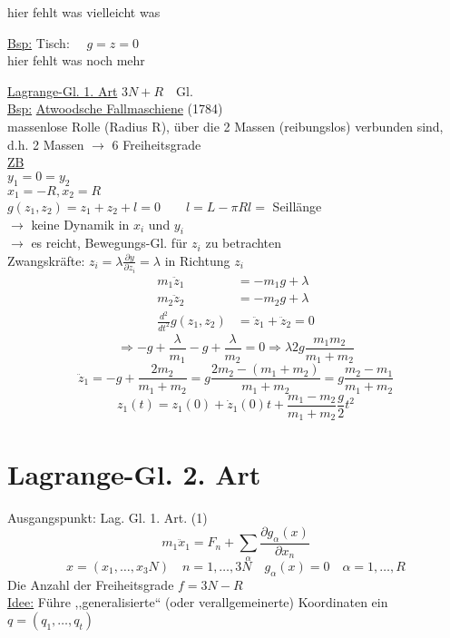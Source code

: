 \documentclass[titlepage,12pt,a4paper,ngerman]{report}
\newcommand{\tx}[1]{\textrm{#1}}
\begin{document}
{hier fehlt was vielleicht was

\underline{Bsp:} Tisch: $  \quad g = z = 0 $\\

hier fehlt was noch mehr


\underline{Lagrange-Gl. 1. Art}
$ 3N+R \quad \tx{Gl.} $\\
\underline{Bsp:} \underline{Atwoodsche Fallmaschiene} (1784)\\
massenlose Rolle (Radius R), über die 2 Massen (reibungslos) verbunden sind, d.h. 2 Massen $ \rightarrow $ 6 Freiheitsgrade\\
\underline{ZB} \\
$ y_1 = 0 = y_2 $\\
$ x_1 = - R , x_2 = R $\\
$  g(z_1,z_2) = z_1 + z_2 + l = 0 \qquad l = L- \pi R  l = $ Seillänge\\
$ \rightarrow $ keine Dynamik in $ x_i $ und $ y_i $\\
$ \rightarrow $ es reicht, Bewegungs-Gl. für $ z_i $ zu betrachten\\
Zwangskräfte: $  z_i = \lambda \frac{\partial y}{\partial z_i}  = \lambda $ in Richtung $ z_i $\\
\begin{align*}
m_1 \ddot{z}_1 &= - m_1 g + \lambda \\
m_2 \ddot{z}_2 &= - m_2 g + \lambda \\
\frac{d^2}{dt^2} g(z_1,z_2) &= \ddot{z}_1 + \ddot{z}_2 = 0
\end{align*}
$$ \Rightarrow -g +\frac{\lambda}{m_1} - g + \frac{\lambda}{m_2} = 0 \Rightarrow \lambda 2 g \frac{m_1 m_2 }{m_1 + m_2}$$
$$ \ddot{z}_1 = -g + \frac{2 m_2}{m_1 + m_2} = g \frac{2 m_2 - (m_1 + m_2)}{m_1 + m_2} = g \frac{m_2 - m_1}{m_1 + m_2}$$
$$ z_1(t) = z_1(0) + \dot{z}_1(0) t + \frac{m_1 - m_2}{m_1 + m_2} \frac{g}{2} t^2 $$

\section{Lagrange-Gl. 2. Art}
Ausgangspunkt: Lag. Gl. 1. Art. (1)
\begin{equation*}
m_1 \ddot{x}_1 = F_n + \sum_\alpha \frac{\partial g_\alpha (x)}{\partial x_n} \tag{1}
\end{equation*}
$$ x = (x_1,\dots,x_3N) \quad n = 1,\dots,3N \quad g_\alpha (x) = 0 \quad \alpha = 1,\dots, R $$
Die Anzahl der Freiheitsgrade $ f = 3N - R $\\
\underline{Idee:} Führe ,,generalisierte`` (oder verallgemeinerte) Koordinaten ein $ q = (q_1, \dots, q_t) $

}
\end{document}
